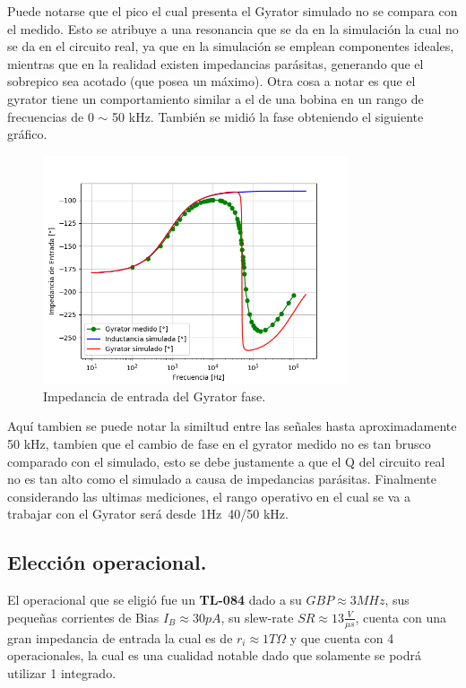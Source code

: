 Puede notarse que el pico el cual presenta el Gyrator simulado no se compara con el medido. Esto se atribuye a una resonancia que se da en la simulación la cual no se da en el circuito real, ya que en la simulación se emplean componentes ideales, mientras que en la realidad existen impedancias parásitas, generando que el sobrepico sea acotado (que posea un máximo). Otra cosa a notar es que el gyrator tiene un comportamiento similar a el de una bobina en un rango de frecuencias de 0 $\sim$ 50 kHz.
También se midió la fase obteniendo el siguiente gráfico.
\begin{figure}[H]	
	\centering
	\includegraphics[width=0.8\textwidth]{ImagenesEj2/ZinGp.png}
	\caption{Impedancia de entrada del Gyrator fase.}
	\label{fig:ZinGp}
\end{figure}

Aquí tambien se puede notar la similtud entre las señales hasta aproximadamente 50 kHz, tambien que el cambio de fase en el gyrator medido no es tan brusco comparado  con el simulado, esto se debe justamente a que el Q del circuito real no es tan alto como el simulado a causa de impedancias parásitas.
Finalmente considerando las ultimas mediciones, el rango operativo en el cual se va  a trabajar con el Gyrator será desde 1Hz~40/50 kHz.
\subsection{Elección operacional.}
El operacional que se eligió fue un \textbf{TL-084} dado a su $GBP \approx 3MHz$, sus pequeñas corrientes de Bias $I_B \approx 30pA$, su slew-rate $SR \approx 13 \frac{V}{\mu s}$, cuenta con una gran impedancia de entrada la cual es de $ r_i \approx 1T \Omega $ y que cuenta con 4 operacionales, la cual es una cualidad notable dado que solamente se podrá utilizar 1 integrado.

